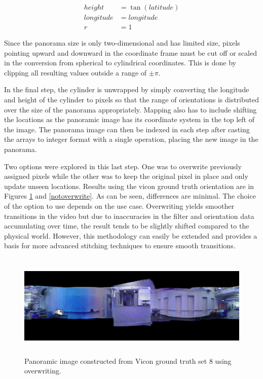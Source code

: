 \documentclass[letterpaper, 10 pt, conference]{ieeeconf}  %
\begin{document}
\begin{equation}
\begin{aligned}height &= \tan(latitude) \\
longitude &= longitude \\
r &= 1
\label{spher2cyl}
\end{aligned}
\end{equation}

Since the panorama size is only two-dimensional and has limited size, pixels pointing upward and downward in the coordinate frame must be cut off or scaled in the conversion from spherical to cylindrical coordinates. This is done by clipping all resulting values outside a range of $\pm \pi$.

In the final step, the cylinder is unwrapped by simply converting the longitude and height of the cylinder to pixels so that the range of orientations is distributed over the size of the panorama appropriately. Mapping also has to include shifting the locations as the panoramic image has its coordinate system in the top left of the image. The panorama image can then be indexed in each step after casting the arrays to integer format with a single operation, placing the new image in the panorama.

Two options were explored in this last step. One was to overwrite previously assigned pixels while the other was to keep the original pixel in place and only update unseen locations. Results using the vicon ground truth orientation are in Figures \ref{overwrite} and \ref{notoverwrite}. As can be seen, differences are minimal. The choice of the option to use depends on the use case. Overwriting yields smoother transitions in the video but due to inaccuracies in the filter and orientation data accumulating over time, the result tends to be slightly shifted compared to the physical world. However, this methodology can easily be extended and provides a basis for more advanced stitching techniques to ensure smooth transitions.

\begin{figure} [ht]
  \includegraphics[width=\textwidth,height=5cm]{panorama_vicon_8_crop}
  \caption{Panoramic image constructed from Vicon ground truth set 8 using overwriting.}
  \label{overwrite}
\end{figure}
\end{document}
